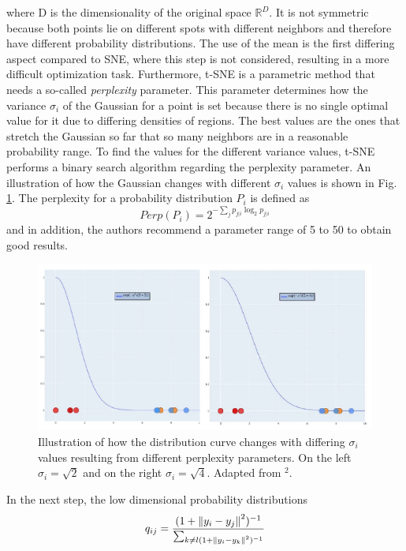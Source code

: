 where D is the dimensionality of the original space $\mathbb{R}^D$. It is not symmetric because both points lie on different spots with different neighbors and therefore have different probability distributions. The use of the mean is the first differing aspect compared to SNE, where this step is not considered, resulting in a more difficult optimization task. Furthermore, t-SNE is a parametric method that needs a so-called \textit{perplexity} parameter. This parameter determines how the variance $\sigma_i$ of the Gaussian for a point is set because there is no single optimal value for it due to differing densities of regions. The best values are the ones that stretch the Gaussian so far that so many neighbors are in a reasonable probability range. To find the values for the different variance values, t-SNE performs a binary search algorithm regarding the perplexity parameter. An illustration of how the Gaussian changes with different $\sigma_i$ values is shown in Fig. \ref{fig:t-sne_sigma}. The perplexity for a probability distribution $P_i$ is defined as
\begin{equation}
    Perp(P_i)= 2^{-\sum_j p_{j|i} \log_2p_{j|i}}
\end{equation}
and in addition, the authors recommend a parameter range of 5 to 50 to obtain good results.
\begin{figure}[!]
	\centering
	\includegraphics[width=\columnwidth]{images/t-sne_sigma.jpg}
	\caption[t-SNE difference in perplexity and therefore sigma]{Illustration of how the distribution curve changes with differing $\sigma_i$ values resulting from different perplexity parameters. On the left $\sigma_i=\sqrt{2}$ and on the right $\sigma_i=\sqrt{4}$. Adapted from $^2$.}
    \label{fig:t-sne_sigma}
\end{figure}
In the next step, the low dimensional probability distributions
\begin{equation}
    q_{ij}=\frac{(1+\norm{y_i-y_j}^2)^{-1}}{\sum_{k\neq l (1+\norm{y_i-y_k}^2)^{-1}}}
\end{equation}
